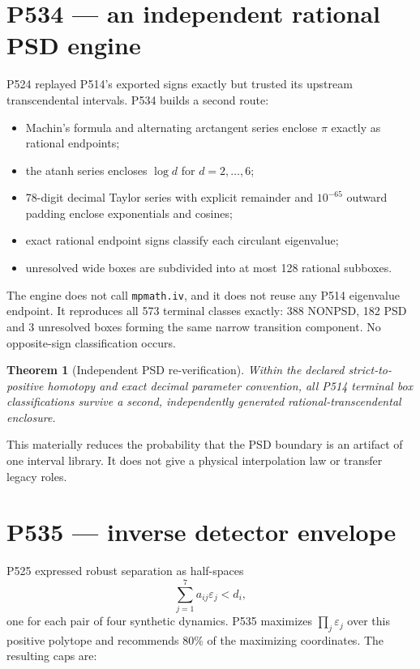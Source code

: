 \documentclass[11pt,a4paper]{article}
\newtheorem{theorem}{Theorem}[section]
\begin{document}
\section{P534 --- an independent rational PSD engine}

P524 replayed P514's exported signs exactly but trusted its upstream transcendental intervals. P534 builds a second route:
\begin{itemize}
\item Machin's formula and alternating arctangent series enclose $\pi$ exactly as rational endpoints;
\item the atanh series encloses $\log d$ for $d=2,\ldots,6$;
\item 78-digit decimal Taylor series with explicit remainder and $10^{-65}$ outward padding enclose exponentials and cosines;
\item exact rational endpoint signs classify each circulant eigenvalue;
\item unresolved wide boxes are subdivided into at most 128 rational subboxes.
\end{itemize}

The engine does not call \texttt{mpmath.iv}, and it does not reuse any P514 eigenvalue endpoint. It reproduces all 573 terminal classes exactly: 388 NONPSD, 182 PSD and 3 unresolved boxes forming the same narrow transition component. No opposite-sign classification occurs.

\begin{theorem}[Independent PSD re-verification]
Within the declared strict-to-positive homotopy and exact decimal parameter convention, all P514 terminal box classifications survive a second, independently generated rational-transcendental enclosure.
\end{theorem}

This materially reduces the probability that the PSD boundary is an artifact of one interval library. It does not give a physical interpolation law or transfer legacy roles.

\section{P535 --- inverse detector envelope}

P525 expressed robust separation as half-spaces
\[
 \sum_{j=1}^7 a_{ij}\varepsilon_j<d_i,
\]
one for each pair of four synthetic dynamics. P535 maximizes $\prod_j\varepsilon_j$ over this positive polytope and recommends $80\%$ of the maximizing coordinates. The resulting caps are:
\end{document}
